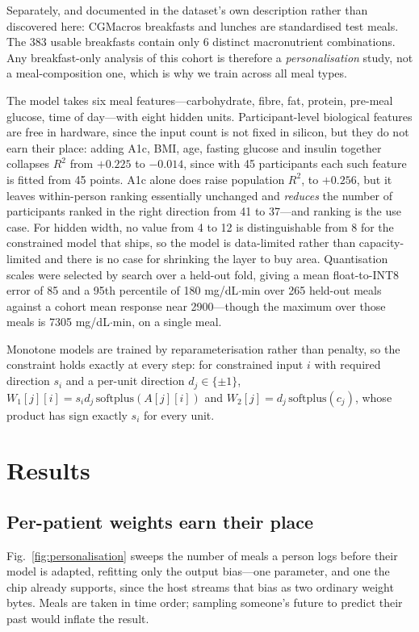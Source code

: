 \documentclass[conference]{IEEEtran}
\begin{document}
Separately, and documented in the dataset's own description rather than
discovered here: CGMacros breakfasts and lunches are standardised test meals.
The 383 usable breakfasts contain only 6 distinct macronutrient combinations.
Any breakfast-only analysis of this cohort is therefore a
\emph{personalisation} study, not a meal-composition one, which is why we train
across all meal types.

The model takes six meal features---carbohydrate, fibre, fat, protein, pre-meal
glucose, time of day---with eight hidden units. Participant-level biological
features are free in hardware, since the input count is not fixed in silicon,
but they do not earn their place: adding A1c, BMI, age, fasting glucose and
insulin together collapses $R^2$ from $+0.225$ to $-0.014$, since with 45
participants each such feature is fitted from 45 points. A1c alone does raise
population $R^2$, to $+0.256$, but it leaves within-person ranking essentially
unchanged and \emph{reduces} the number of participants ranked in the right
direction from 41 to 37---and ranking is the use case. For hidden width, no
value from 4 to 12 is distinguishable from 8 for the constrained model that
ships, so the model is data-limited rather than capacity-limited and there is
no case for shrinking the layer to buy area. Quantisation scales were selected by
search over a held-out fold, giving a mean float-to-INT8 error of 85 and a 95th
percentile of 180 mg/dL$\cdot$min over 265 held-out meals against a cohort mean
response near 2900---though the maximum over those meals is
7305 mg/dL$\cdot$min, on a single meal.

Monotone models are trained by reparameterisation rather than penalty, so the
constraint holds exactly at every step: for constrained input $i$ with required
direction $s_i$ and a per-unit direction $d_j \in \{\pm 1\}$,
$W_1[j][i] = s_i d_j\,\mathrm{softplus}(A[j][i])$ and
$W_2[j] = d_j\,\mathrm{softplus}(c_j)$, whose product has sign exactly $s_i$
for every unit.

\section{Results}

\subsection{Per-patient weights earn their place}

Fig.~\ref{fig:personalisation} sweeps the number of meals a person logs before
their model is adapted, refitting only the output bias---one parameter, and one
the chip already supports, since the host streams that bias as two ordinary
weight bytes. Meals are taken in time order; sampling someone's future to
predict their past would inflate the result.
\end{document}
